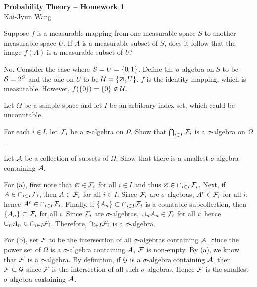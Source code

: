 \documentclass[a4paper, 12pt]{article}
\begin{document}
 

\begin{center}
    \Large
    \textbf{Probability Theory  -- Homework 1}\\
    \large{Kai-Jyun Wang}
\end{center}

\begin{exercise}{1.1}
    Suppose $f$ is a measurable mapping from one measurable space 
    $S$ to another measurable space $U$. If $A$ is a measurable 
    subset of $S$, does it follow that the image $f(A)$ is a 
    measurable subset of $U$? 
\end{exercise}
\begin{solution}
    No. Consider the case where $S = U = \set{0,1}$. Define 
    the $\sigma$-algebra on $S$ to be $\S = 2^S$ and the one 
    on $U$ to be $\U = \set{\varnothing, U}$. $f$ is the identity 
    mapping, which is measurable. However, $f(\set{0}) = \set{0}\notin\U$.  
\end{solution}

\begin{exercise}{1.2}
    Let $\Omega$ be a sample space and let $I$ be an arbitrary 
    index set, which could be uncountable. 
    \begin{thmenum}
        \item For each $i\in I$, let $\F_i$ be a $\sigma$-algebra on 
        $\Omega$. Show that $\bigcap_{i\in I}\F_i$ is a 
        $\sigma$-algebra on $\Omega$. 
        \item Let $\A$ be a collection of subsets of $\Omega$. Show that 
        there is a smallest $\sigma$-algebra containing $\A$. 
    \end{thmenum}
\end{exercise}
\begin{solution}
    For (a), first note that $\varnothing\in\F_i$ for all 
    $i\in I$ and thus $\varnothing\in\cap_{i\in I}\F_i$. 
    Next, if $A\in\cap_{i\in I}\F_i$, then $A\in\F_i$ for 
    all $i\in I$. Since $\F_i$ are $\sigma$-algebras, $A^c\in\F_i$ for 
    all $i$; hence $A^c\in\cap_{i\in I}\F_i$. Finally, if 
    $\set{A_n}\subset\cap_{i\in I}\F_i$ is a countable 
    subcollection, then $\set{A_n}\subset\F_i$ for all $i$. 
    Since $\F_i$ are $\sigma$-algebras, $\cup_n A_n\in\F_i$ for 
    all $i$; hence $\cup_n A_n\in\cap_{i\in I}\F_i$. 
    Therefore, $\cap_{i\in I}\F_i$ is a $\sigma$-algebra.
    
    For (b), set $\F$ to be the intersection of all $\sigma$-algebras 
    containing $\A$. Since the power set of $\Omega$ is a $\sigma$-algebra 
    containing $\A$, $\F$ is non-empty. By (a), we know that $\F$ is 
    a $\sigma$-algebra. By definition, if $\G$ is a $\sigma$-algebra 
    containing $\A$, then $\F\subset\G$ since $\F$ is the intersection 
    of all such $\sigma$-algebras. Hence $\F$ is the smallest 
    $\sigma$-algebra containing $\A$.
\end{solution}
\end{document}
